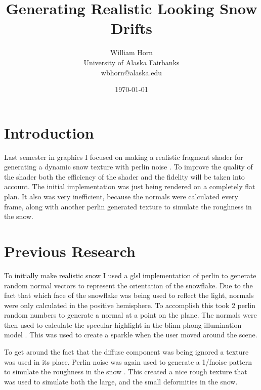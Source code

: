 \documentclass{IEEEtran}
\begin{document}
\title{Generating Realistic Looking Snow Drifts}
\author{William Horn\\University of Alaska Fairbanks\\wbhorn@alaska.edu}
\date{\today}
\maketitle

\section{Introduction}

Last semester in graphics I focused on making a realistic fragment shader for
generating a dynamic snow texture  with perlin noise \cite{wiki:perlin}. To
improve the quality of the shader both the efficiency of the shader and the
fidelity will be taken into account.  The initial implementation was just being
rendered on a completely flat plan. It also was very inefficient, because the
normals were calculated every frame, along with another perlin generated texture
to simulate the roughness in the snow.

\section{Previous Research}

To initially make realistic snow I used a glsl implementation of perlin
\cite{noiseglsl} to generate random normal vectors to represent the orientation
of the snowflake. Due to the fact that which face of the snowflake was being
used to reflect the light, normals were only calculated in the positive
hemisphere. To accomplish this took 2 perlin random numbers to generate a normal
at a point on the plane. The normals were then used to calculate the specular
highlight in the blinn phong illumination model \cite{blinn1977models}.  This
was used to create a sparkle when the user moved around the scene.

To get around the fact that the diffuse component was being ignored a texture
was used in its place. Perlin noise was again used to generate a 1/fnoise
pattern to simulate the roughness in the snow .  This
created a nice rough texture that was used to simulate both the large, and the
small deformities in the snow.
\end{document}
